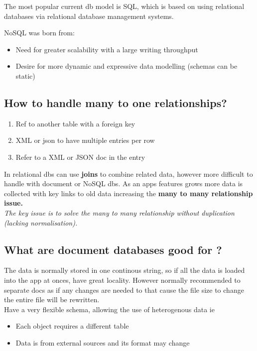 \documentclass[11pt]{scrartcl} %
\begin{document}
The most popular current db model is SQL, which is based on using relational databases via relational database management
systems.

NoSQL was born from:
\begin{itemize}
	\item Need for greater scalability with a large writing throughput
	\item Desire for more dynamic and expressive data modelling (schemas can be static)
\end{itemize}

\subsection{How to handle many to one relationships?}

\begin{enumerate}
	\item Ref to another table with a foreign key
	\item XML or json to have multiple entries per row
	\item Refer to a XML or JSON doc in the entry
\end{enumerate}

In relational dbs can use \textbf{joins} to combine related data, however more difficult to handle with document or NoSQL dbs.
As an apps features grows more data is collected with key links to old data increasing the \textbf{many to many relationship issue.}\\

\textit{The key issue is to solve the many to many relationship without duplication (lacking normalisation).}

\subsection{What are document databases good for ?}

The data is normally stored in one continous string, so if all the data is loaded into the app at onces, have great locality. However normally recommended to separate docs
as if any changes are needed to that cause the file size to change the entire file will be rewritten.\\

Have a very flexible schema, allowing the use of heterogenous data ie 

\begin{itemize}
	\item Each object requires a different table
	\item Data is from external sources and its format may change
\end{itemize}
\end{document}
